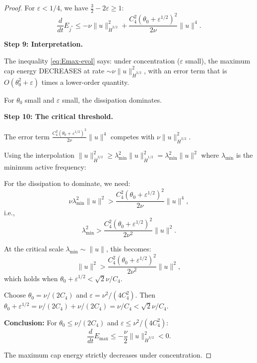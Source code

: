 \documentclass[11pt]{article}
\theoremstyle{definition}
\begin{document}
\begin{proof}
For $\varepsilon < 1/4$, we have $\frac{3}{2} - 2\varepsilon \geq 1$:
\begin{equation}\label{eq:Emax-evol}
\frac{d}{dt}E_{j^*} \leq -\nu\|u\|_{\dot{H}^{3/2}}^2 + \frac{C_4^2(\theta_0 + \varepsilon^{1/2})^2}{2\nu}\|u\|^4.
\end{equation}

\textbf{Step 9: Interpretation.}

The inequality \eqref{eq:Emax-evol} says: under concentration ($\varepsilon$ small), the maximum cap energy DECREASES at rate $\sim \nu\|u\|_{\dot{H}^{3/2}}^2$, with an error term that is $O(\theta_0^2 + \varepsilon)$ times a lower-order quantity.

For $\theta_0$ small and $\varepsilon$ small, the dissipation dominates.

\textbf{Step 10: The critical threshold.}

The error term $\frac{C_4^2(\theta_0 + \varepsilon^{1/2})^2}{2\nu}\|u\|^4$ competes with $\nu\|u\|_{\dot{H}^{3/2}}^2$.

Using the interpolation $\|u\|_{\dot{H}^{3/2}}^2 \geq \lambda_{\min}^2 \|u\|_{\dot{H}^{1/2}}^2 = \lambda_{\min}^2 \|u\|^2$ where $\lambda_{\min}$ is the minimum active frequency:

For the dissipation to dominate, we need:
\begin{equation}
\nu \lambda_{\min}^2 \|u\|^2 > \frac{C_4^2(\theta_0 + \varepsilon^{1/2})^2}{2\nu}\|u\|^4,
\end{equation}
i.e.,
\begin{equation}
\lambda_{\min}^2 > \frac{C_4^2(\theta_0 + \varepsilon^{1/2})^2}{2\nu^2}\|u\|^2.
\end{equation}

At the critical scale $\lambda_{\min} \sim \|u\|$, this becomes:
\begin{equation}
\|u\|^2 > \frac{C_4^2(\theta_0 + \varepsilon^{1/2})^2}{2\nu^2}\|u\|^2,
\end{equation}
which holds when $\theta_0 + \varepsilon^{1/2} < \sqrt{2}\nu/C_4$.

Choose $\theta_0 = \nu/(2C_4)$ and $\varepsilon = \nu^2/(4C_4^2)$. Then $\theta_0 + \varepsilon^{1/2} = \nu/(2C_4) + \nu/(2C_4) = \nu/C_4 < \sqrt{2}\nu/C_4$. \checkmark

\textbf{Conclusion:} For $\theta_0 \leq \nu/(2C_4)$ and $\varepsilon \leq \nu^2/(4C_4^2)$:
\begin{equation}
\frac{d}{dt}E_{\max} \leq -\frac{\nu}{2}\|u\|_{\dot{H}^{3/2}}^2 < 0.
\end{equation}

The maximum cap energy strictly decreases under concentration.
\end{proof}
\end{document}
